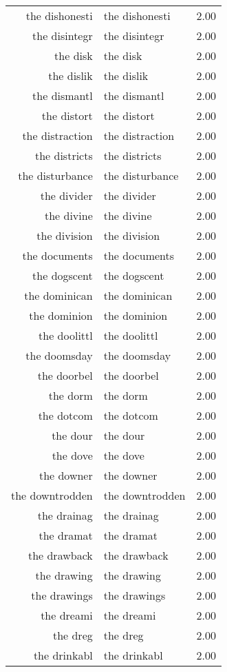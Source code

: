 \begin{table}[ht]
\begin{tabular}{rlr}
  the dishonesti & the dishonesti & 2.00 \\ 
  the disintegr & the disintegr & 2.00 \\ 
  the disk & the disk & 2.00 \\ 
  the dislik & the dislik & 2.00 \\ 
  the dismantl & the dismantl & 2.00 \\ 
  the distort & the distort & 2.00 \\ 
  the distraction & the distraction & 2.00 \\ 
  the districts & the districts & 2.00 \\ 
  the disturbance & the disturbance & 2.00 \\ 
  the divider & the divider & 2.00 \\ 
  the divine & the divine & 2.00 \\ 
  the division & the division & 2.00 \\ 
  the documents & the documents & 2.00 \\ 
  the dogscent & the dogscent & 2.00 \\ 
  the dominican & the dominican & 2.00 \\ 
  the dominion & the dominion & 2.00 \\ 
  the doolittl & the doolittl & 2.00 \\ 
  the doomsday & the doomsday & 2.00 \\ 
  the doorbel & the doorbel & 2.00 \\ 
  the dorm & the dorm & 2.00 \\ 
  the dotcom & the dotcom & 2.00 \\ 
  the dour & the dour & 2.00 \\ 
  the dove & the dove & 2.00 \\ 
  the downer & the downer & 2.00 \\ 
  the downtrodden & the downtrodden & 2.00 \\ 
  the drainag & the drainag & 2.00 \\ 
  the dramat & the dramat & 2.00 \\ 
  the drawback & the drawback & 2.00 \\ 
  the drawing & the drawing & 2.00 \\ 
  the drawings & the drawings & 2.00 \\ 
  the dreami & the dreami & 2.00 \\ 
  the dreg & the dreg & 2.00 \\ 
  the drinkabl & the drinkabl & 2.00 \\ 

\end{tabular}
\end{table}
